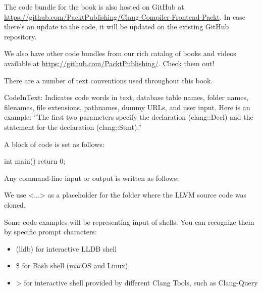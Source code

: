 
The code bundle for the book is also hosted on GitHub at \url{https://github.com/PacktPublishing/Clang-Compiler-Frontend-Packt}. In case there's an update to the code, it will be updated on the existing GitHub repository.

We also have other code bundles from our rich catalog of books and videos available at \url{https://github.com/PacktPublishing/}. Check them out!



There are a number of text conventions used throughout this book.

CodeInText: Indicates code words in text, database table names, folder names, filenames, file extensions, pathnames, dummy URLs, and user input. Here is an example: ”The first two parameters specify the declaration (clang::Decl) and the statement for the declaration (clang::Stmt).”

A block of code is set as follows:

\begin{cpp}
int main() {
  return 0;
 }
\end{cpp}

Any command-line input or output is written as follows:


We use <...> as a placeholder for the folder where the LLVM source code was cloned.

Some code examples will be representing input of shells. You can recognize them by specific prompt characters:


\begin{itemize}
\item
(lldb) for interactive LLDB shell

\item
\$ for Bash shell (macOS and Linux)

\item
> for interactive shell provided by different Clang Tools, such as Clang-Query
\end{itemize}





